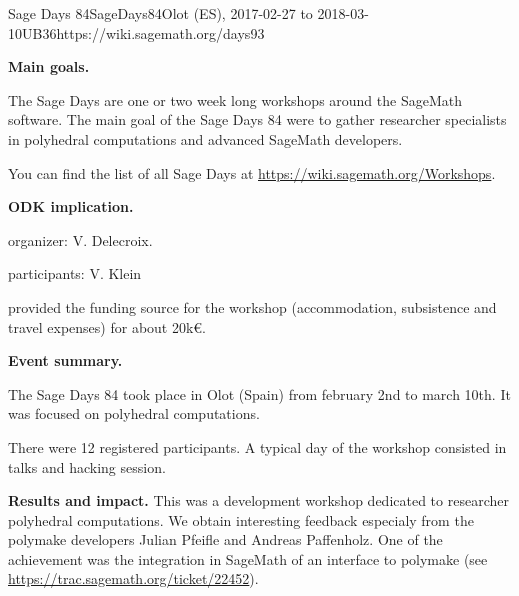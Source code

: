 \begin{event}{Sage Days 84}{SageDays84}{Olot (ES),
2017-02-27 to 2018-03-10}{UB}{36}{https://wiki.sagemath.org/days93}

\textbf{Main goals.}

The Sage Days are one or two week long workshops around the
SageMath software. The main goal of the Sage Days 84 were to
gather researcher specialists in polyhedral computations and advanced
SageMath developers.

You can find the list of all Sage Days at
\url{https://wiki.sagemath.org/Workshops}.

\textbf{ODK implication.} 

\ODK organizer: V. Delecroix.

\ODK participants: V. Klein

\ODK provided the funding source for the workshop (accommodation,
subsistence and travel expenses) for about 20k\euro.

\textbf{Event summary.} 

The Sage Days 84 took place in Olot (Spain) from february 2nd to
march 10th. It was focused on polyhedral computations.

There were 12 registered participants. A typical day of the workshop
consisted in talks and hacking session.

\textbf{Results and impact.} 
This was a development workshop dedicated to researcher polyhedral
computations. We obtain interesting feedback especialy from
the polymake developers Julian Pfeifle and Andreas Paffenholz. One
of the achievement was the integration in SageMath of an interface
to polymake
(see \url{https://trac.sagemath.org/ticket/22452}).
\end{event}
